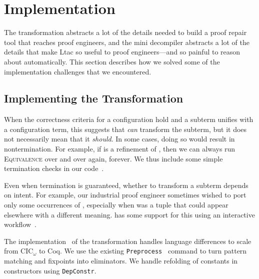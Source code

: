 \section{Implementation}
\label{sec:impl}

The transformation abstracts a lot of the details needed to build a proof repair tool that reaches proof engineers,
and the mini decompiler abstracts a lot of the details that make Ltac so useful to proof engineers---and so painful to 
reason about automatically.
This section describes how we solved some of the implementation challenges that we encountered.

\subsection{Implementing the Transformation}
\label{sec:implementation}

When the correctness criteria for a configuration hold and a subterm unifies with a configuration term, this suggests that \toolname \textit{can}
transform the subterm, but it does not necessarily mean that it \textit{should}.
In some cases, doing so would result in nontermination.
For example, if \B is a refinement of \A, then we can always run \textsc{Equivalence}
over and over again, forever.
We thus include some simple termination checks in our code~. %

Even when termination is guaranteed, whether to transform a subterm depends on intent.
For example, our industrial proof engineer sometimes wished to port only some occurrences of \A,
especially when \A was a tuple that could appear elsewhere
with a different meaning.
\toolname has some support for this using an interactive workflow~. %

The implementation~ %
of the transformation handles language differences to scale from CIC$_{\omega}$ to Coq.
We use the existing \lstinline{Preprocess}~\cite{Ringer2019} command to turn pattern matching and fixpoints into 
eliminators.
We handle refolding of constants in constructors using \lstinline{DepConstr}.

